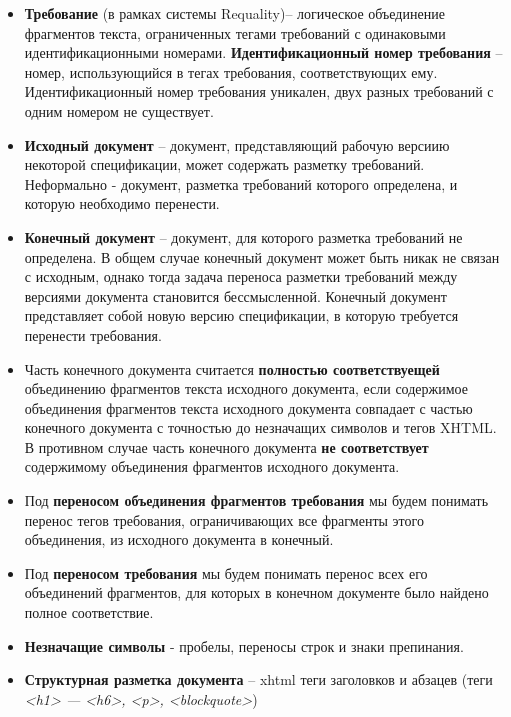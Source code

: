 \begin{itemize}
\item \textbf{Требование} (в рамках системы Requality)– логическое объединение фрагментов текста, ограниченных тегами требований с одинаковыми идентификационными номерами. \textbf{Идентификационный номер требования} – номер, использующийся в тегах требования, соответствующих ему. Идентификационный номер требования уникален, двух разных требований с одним номером не существует.

\item \textbf{Исходный документ} – документ, представляющий рабочую версиию некоторой спецификации, может содержать разметку требований. Неформально - документ, разметка требований которого определена, и которую необходимо перенести.

\item \textbf{Конечный документ} – документ, для которого разметка требований не определена. В общем случае конечный документ может быть никак не связан с исходным, однако тогда задача переноса разметки требований между версиями документа становится бессмысленной. Конечный документ представляет собой новую версию спецификации, в которую требуется перенести требования.

\item Часть конечного документа считается \textbf{полностью соответствуещей} объединению фрагментов текста исходного документа, если содержимое объединения фрагментов текста исходного документа совпадает с частью конечного документа с точностью до незначащих символов и тегов XHTML. В противном случае часть конечного документа \textbf{не соответствует} содержимому объединения фрагментов исходного документа.

\item Под \textbf{переносом объединения фрагментов требования} мы будем понимать перенос тегов требования, ограничивающих все фрагменты этого объединения, из исходного документа в конечный. 

\item Под \textbf{переносом требования} мы будем понимать перенос всех его объединений фрагментов, для которых в конечном документе было найдено полное соответствие. 

\item \textbf{Незначащие символы} - пробелы, переносы строк и знаки препинания.

\item \textbf{Структурная разметка документа} – xhtml теги заголовков и абзацев (теги \emph{<h1> --- <h6>, <p>, <blockquote>})

\end{itemize}